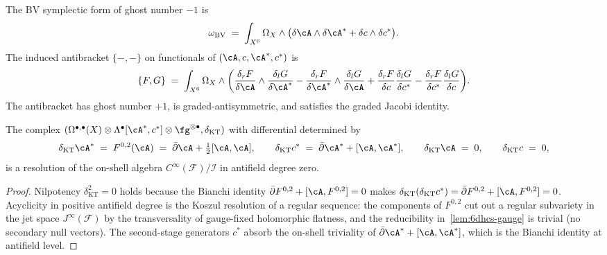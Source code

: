 \begin{definition}
\label{def:6dhcs-antibracket}
The BV symplectic form of ghost number $-1$ is
\begin{equation}\label{eq:6dhcs-symplectic}
 \omega_{\mathrm{BV}}
 \;=\;
 \int_{X^6} \Omega_X \wedge \bigl( \delta \cA \wedge \delta \cA^*
 + \delta c \wedge \delta c^* \bigr).
\end{equation}
The induced antibracket $\{-,-\}$ on functionals of
$(\cA, c, \cA^*, c^*)$ is
\begin{equation}\label{eq:6dhcs-antibracket-formula}
 \{F, G\}
 \;=\;
 \int_{X^6} \Omega_X \wedge
 \biggl(
 \frac{\delta_r F}{\delta \cA} \wedge \frac{\delta_l G}{\delta \cA^*}
 - \frac{\delta_r F}{\delta \cA^*} \wedge \frac{\delta_l G}{\delta \cA}
 + \frac{\delta_r F}{\delta c} \frac{\delta_l G}{\delta c^*}
 - \frac{\delta_r F}{\delta c^*} \frac{\delta_l G}{\delta c}
 \biggr).
\end{equation}
The antibracket has ghost number $+1$, is graded-antisymmetric, and
satisfies the graded Jacobi identity.
\end{definition}

\begin{proposition}
\label{prop:6dhcs-kt-resolution}
The complex $(\Omega^{\bullet,\bullet}(X) \otimes \Lambda^\bullet
[\cA^*, c^*] \otimes \fg^{\otimes\bullet}, \delta_{\mathrm{KT}})$
with differential determined by
\begin{equation}\label{eq:6dhcs-kt-differential}
 \delta_{\mathrm{KT}} \cA^* \;=\; F^{0,2}(\cA) \;=\; \bar\partial \cA
 + \tfrac12[\cA, \cA],
 \qquad
 \delta_{\mathrm{KT}} c^* \;=\; \bar\partial \cA^* + [\cA, \cA^*],
 \qquad
 \delta_{\mathrm{KT}} \cA \;=\; 0,
 \qquad
 \delta_{\mathrm{KT}} c \;=\; 0,
\end{equation}
is a resolution of the on-shell algebra
$C^\infty(\mathcal{F})/\mathcal{I}$ in antifield degree zero.
\end{proposition}

\begin{proof}
Nilpotency $\delta_{\mathrm{KT}}^2 = 0$ holds because the Bianchi
identity $\bar\partial F^{0,2} + [\cA, F^{0,2}] = 0$ makes
$\delta_{\mathrm{KT}}(\delta_{\mathrm{KT}} c^*) = \bar\partial F^{0,2}
+ [\cA, F^{0,2}] = 0$. Acyclicity in positive antifield degree is the
Koszul resolution of a regular sequence: the components of $F^{0,2}$
cut out a regular subvariety in the jet space $J^\infty(\mathcal{F})$
by the transversality of gauge-fixed holomorphic flatness, and the
reducibility in~\ref{lem:6dhcs-gauge} is trivial (no secondary
null vectors). The second-stage generators $c^*$ absorb the on-shell
triviality of $\bar\partial \cA^* + [\cA, \cA^*]$, which is the
Bianchi identity at antifield level.
\end{proof}

